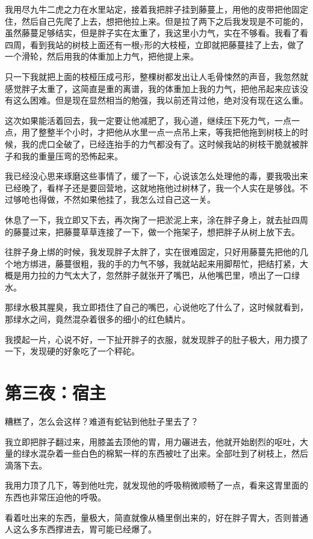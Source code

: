 我用尽九牛二虎之力在水里站定，接着我把胖子挂到藤蔓上，用他的皮带把他固定住，然后自己先爬了上去，想把他拉上来。但是拉了两下之后我发现是不可能的，虽然藤蔓足够结实，但是胖子实在太重了，我这里小力气，实在不够看。我看了看四周，看到我站的树枝上面还有一根y形的大枝桠，立即就把藤蔓挂了上去，做了一个滑轮，然后用我的体重加上力气，把他提上来。

只一下我就把上面的枝桠压成弓形，整棵树都发出让人毛骨悚然的声音，我忽然就感觉胖子太重了，这简直是重的离谱，我的体重加上我的力气，把他吊起来应该没有这么困难。但是现在显然相当的勉强，我以前还背过他，绝对没有现在这么重。

这次如果能活着回去，我一定要让他减肥了，我心道，继续压下死力气，一点一点，用了整整半个小时，才把他从水里一点一点吊上来，等我把他拖到树枝上的时候，我的虎口全破了，已经连抬手的力气都没有了。这时候我站的树枝干脆就被胖子和我的重量压弯的恐怖起来。

我已经没心思来琢磨这些事情了，缓了一下，心说该怎么处理他的毒，要我吸出来已经晚了，看样子还是要回营地，这就地拖他过树林了，我一个人实在是够戗。不过够呛也得做，不然如果他挂了，我怎么过自己这一关。

休息了一下，我立即又下去，再次掬了一把淤泥上来，涂在胖子身上，就去扯四周的藤蔓过来，把藤蔓草草连接了一下，做一个拖架子，想把胖子从树上放下去。

往胖子身上绑的时候，我发现胖子太胖了，实在很难固定，只好用藤蔓先把他的几个地方绑进，藤蔓很粗，我的手的力气不够，我就站起来用脚帮忙，把结打紧，大概是用力拉的力气太大了，忽然胖子就张开了嘴巴，从他嘴巴里，喷出了一口绿水。

那绿水极其腥臭，我立即捂住了自己的嘴巴，心说他吃了什么了，这时候就看到，那绿水之间，竟然混杂着很多的细小的红色鳞片。

我摸起一片，心说不好，一下扯开胖子的衣服，就发现胖子的肚子极大，用力摸了一下，发现硬的好象吃了一个秤砣。

\chapter{第三夜：宿主}

糟糕了，怎么会这样？难道有蛇钻到他肚子里去了？

我立即把胖子翻过来，用膝盖去顶他的胃，用力碾进去，他就开始剧烈的呕吐，大量的绿水混杂着一些白色的棉絮一样的东西被吐了出来。全部吐到了树枝上，然后滴落下去。

我用力顶了几下，等到他吐完，就发现他的呼吸稍微顺畅了一点，看来这胃里面的东西也非常压迫他的呼吸。

看着吐出来的东西，量极大，简直就像从桶里倒出来的，好在胖子胃大，否则普通人这么多东西撑进去，胃可能已经爆了。

